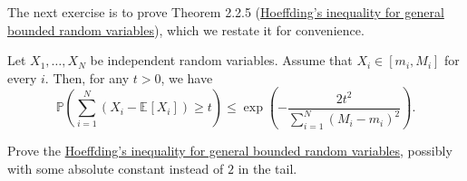 The next exercise is to prove Theorem 2.2.5 (\hyperref[thm:Hoeffding-inequality]{Hoeffding's inequality for general bounded random variables}), which we restate it for convenience.

\begin{theorem}\label{thm:Hoeffding-inequality}
	Let \(X_1, \dots , X_N\) be independent random variables. Assume that \(X_i \in [m_i, M_i]\) for every \(i\). Then, for any \(t > 0\), we have
	\[
		\mathbb{P} \left( \sum_{i=1}^{N} (X_i - \mathbb{E}_{}[X_i] ) \geq t \right)
		\leq \exp (- \frac{2t^2}{\sum_{i=1}^{N} (M_i - m_i)^2}).
	\]
\end{theorem}

\begin{problem*}[Exercise 2.2.7]\label{ex2.2.7}
	Prove the \hyperref[thm:Hoeffding-inequality]{Hoeffding's inequality for general bounded random variables}, possibly with some absolute constant instead of \(2\) in the tail.
\end{problem*}
